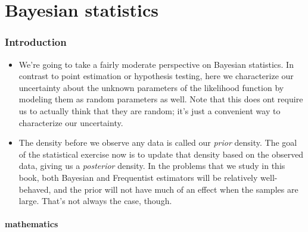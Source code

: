 

\part*{Bayesian statistics}%

\section{Introduction}

\begin{itemize}

\item We're going to take a fairly moderate perspective on Bayesian
  statistics.  In contrast to point estimation or hypothesis testing,
  here we characterize our uncertainty about the unknown parameters of
  the likelihood function by modeling them as random parameters as
  well.  Note that this does ont require us to actually think that
  they are random; it's just a convenient way to characterize our
  uncertainty.

\item The density before we observe any data is called our
  \emph{prior} density.  The goal of the statistical exercise now is
  to update that density based on the observed data, giving us a
  \emph{posterior} density.  In the problems that we study in this
  book, both Bayesian and Frequentist estimators will be relatively
  well-behaved, and the prior will not have much of an effect when the
  samples are large.  That's not always the case, though.

\end{itemize}

\subsection{mathematics}

